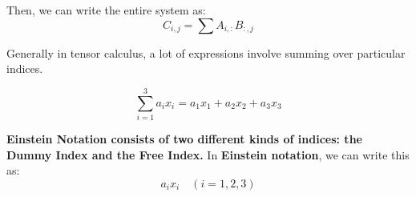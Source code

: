 Then, we can write the entire system as:
\begin{equation}
    C_{i,j} = \sum A_{i,:}B_{:,j}
\end{equation}




Generally in tensor calculus, a lot of expressions involve summing over particular indices.

\begin{equation}
    \sum^3_{i=1} a_i x_i = a_1 x_1 + a_2 x_2 + a_3 x_3
\end{equation}

\textbf{Einstein Notation consists of two different kinds of indices: the Dummy Index and the Free Index.} \bigskip
In \textbf{Einstein notation}, we can write this as:
\begin{equation}
    a_i x_i \quad (i = 1,2,3)
\end{equation}


